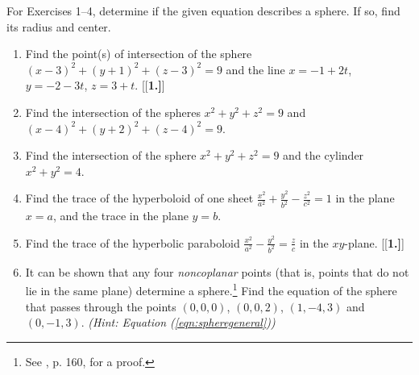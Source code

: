 \centerline{}\label{sec1dot6}
\par\noindent For Exercises 1--4, determine if the given equation describes a sphere. 
If so, find its radius and center.
\begin{enumerate}[\bfseries 1.]
 \item Find the point(s) of intersection of the sphere $(x - 3)^2 + (y + 1)^2 + (z - 3)^2 = 9$ and the line
  $x = -1 + 2t$, $y = -2 - 3t$, $z = 3 + t$.
\smallskip
{}[{[\bfseries 1.]}]
 \item Find the intersection of the spheres $x^2 + y^2 + z^2 = 9$ and $(x - 4)^2 + (y + 2)^2 + (z - 4)^2 = 9$.
 \item Find the intersection of the sphere $x^2 + y^2 + z^2 = 9$ and the cylinder $x^2 + y^2 = 4$.
 \item Find the trace of the hyperboloid of one sheet $\frac{x^2}{a^2} + \frac{y^2}{b^2} - \frac{z^2}{c^2} = 1$ in
  the plane $x = a$, and the trace in the plane $y = b$.
 \item Find the trace of the hyperbolic paraboloid $\frac{x^2}{a^2} - \frac{y^2}{b^2} = \frac{z}{c}$ in the $xy$-plane.
[{[\bfseries 1.]}]
\item It can be shown that any four \emph{noncoplanar} points (that is, points that do not lie in the same plane)
  determine a sphere.\footnote{See \cite{wk}, p. 160, for a proof.} Find the equation of the sphere that passes through
  the points $(0,0,0)$, $(0,0,2)$, $(1,-4,3)$ and $(0,-1,3)$. 
\emph{(Hint: Equation (\ref{eqn:spheregeneral}))}


\end{enumerate}
